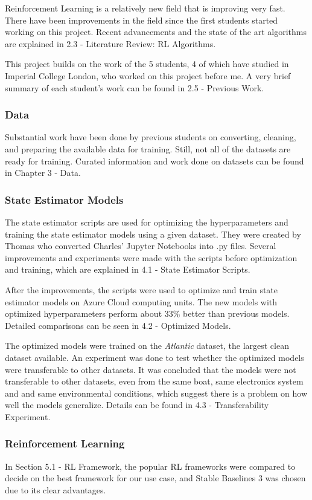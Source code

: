 \documentclass[12pt,twoside]{report}
\begin{document}
Reinforcement Learning is a relatively new field that is improving very fast. There have been improvements in the field since the first students started working on this project. Recent advancements and the state of the art algorithms are explained in 2.3 - Literature Review: RL Algorithms.

This project builds on the work of the 5 students, 4 of which have studied in Imperial College London, who worked on this project before me. A very brief summary of each student's work can be found in 2.5 - Previous Work.

\subsubsection{Data}
Substantial work have been done by previous students on converting, cleaning, and preparing the available data for training. Still, not all of the datasets are ready for training. Curated information and work done on datasets can be found in Chapter 3 - Data.

\subsubsection{State Estimator Models}
The state estimator scripts are used for optimizing the hyperparameters and training the state estimator models using a given dataset. They were created by Thomas who converted Charles' Jupyter Notebooks into .py files. Several improvements and experiments were made with the scripts before optimization and training, which are explained in 4.1 - State Estimator Scripts.

After the improvements, the scripts were used to optimize and train state estimator models on Azure Cloud computing units. The new models with optimized hyperparameters perform about 33\% better than previous models. Detailed comparisons can be seen in 4.2 - Optimized Models.

The optimized models were trained on the \textit{Atlantic} dataset, the largest clean dataset available. An experiment was done to test whether the optimized models were transferable to other datasets. It was concluded that the models were not transferable to other datasets, even from the same boat, same electronics system and and same environmental conditions, which suggest there is a problem on how well the models generalize. Details can be found in 4.3 - Transferability Experiment.


\subsubsection{Reinforcement Learning}
In Section 5.1 - RL Framework, the popular RL frameworks were compared to decide on the best framework for our use case, and Stable Baselines 3 was chosen due to its clear advantages.
\end{document}
